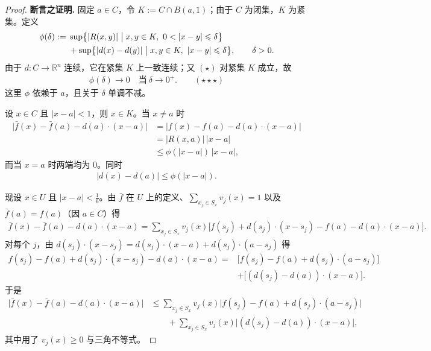 \documentclass[../../main.tex]{subfiles}%
\begin{document}
\begin{proof}
\textbf{断言之证明.} 固定 $a\in C$，令 $K:=C\cap B(a,1)$；由于 $C$ 为闭集，$K$ 为紧集。定义
\begin{align*}
\phi(\delta):={}&\sup\bigl\{\lvert R(x,y)\rvert\bigm|x,y\in K,\ 0<\lvert x-y\rvert\leqslant\delta\bigr\}\\
&+\sup\bigl\{\lvert d(x)-d(y)\rvert\bigm|x,y\in K,\ \lvert x-y\rvert\leqslant\delta\bigr\},\qquad\delta>0.
\end{align*}
由于 $d:C\to\mathbb{R}^n$ 连续，它在紧集 $K$ 上一致连续；又 $(\star)$ 对紧集 $K$ 成立，故
\begin{align*}
\phi(\delta)\to0\quad\text{当}\ \delta\to0^{+}.\qquad(\star\star\star)
\end{align*}
这里 $\phi$ 依赖于 $a$，且关于 $\delta$ 单调不减。

设 $x\in C$ 且 $\lvert x-a\rvert<1$，则 $x\in K$。当 $x\neq a$ 时
\begin{align*}
\bigl\lvert\bar f(x)-\bar f(a)-d(a)\cdot(x-a)\bigr\rvert
&=\bigl\lvert f(x)-f(a)-d(a)\cdot(x-a)\bigr\rvert\\
&=\lvert R(x,a)\rvert\,\lvert x-a\rvert\\
&\leqslant\phi(\lvert x-a\rvert)\,\lvert x-a\rvert,
\end{align*}
而当 $x=a$ 时两端均为 $0$。同时
\begin{align*}
\lvert d(x)-d(a)\rvert\leqslant\phi(\lvert x-a\rvert).
\end{align*}

现设 $x\in U$ 且 $\lvert x-a\rvert<\frac{1}{6}$。由 $\bar f$ 在 $U$ 上的定义、$\sum_{x_j\in S_x}v_j(x)=1$ 以及 $\bar f(a)=f(a)$（因 $a\in C$）得
\begin{align*}
\bar f(x)-\bar f(a)-d(a)\cdot(x-a)=\sum_{x_j\in S_x}v_j(x)\bigl[f(s_j)+d(s_j)\cdot(x-s_j)-f(a)-d(a)\cdot(x-a)\bigr].
\end{align*}
对每个 $j$，由 $d(s_j)\cdot(x-s_j)=d(s_j)\cdot(x-a)+d(s_j)\cdot(a-s_j)$ 得
\begin{align*}
f(s_j)-f(a)+d(s_j)\cdot(x-s_j)-d(a)\cdot(x-a)
={}&\bigl[f(s_j)-f(a)+d(s_j)\cdot(a-s_j)\bigr]\\
&+\bigl[(d(s_j)-d(a))\cdot(x-a)\bigr].
\end{align*}
于是
\begin{align*}
\bigl\lvert\bar f(x)-\bar f(a)-d(a)\cdot(x-a)\bigr\rvert
&\leqslant\sum_{x_j\in S_x}v_j(x)\bigl\lvert f(s_j)-f(a)+d(s_j)\cdot(a-s_j)\bigr\rvert\\
&\qquad+\sum_{x_j\in S_x}v_j(x)\bigl\lvert(d(s_j)-d(a))\cdot(x-a)\bigr\rvert,
\end{align*}
其中用了 $v_j(x)\geqslant0$ 与三角不等式。


\end{proof}
\end{document}
